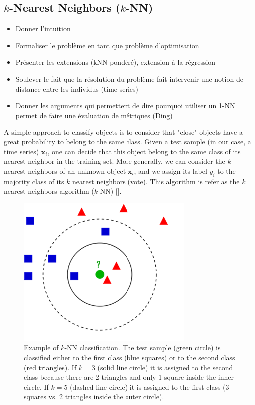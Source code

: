 \subsection{$k$-Nearest Neighbors ($k$-NN)}
\begin{itemize}
	\item Donner l'intuition
	\item Formaliser le problème en tant que problème d'optimisation
	\item Présenter les extensions (kNN pondéré), extension à la régression
	\item Soulever le fait que la résolution du problème fait intervenir une notion de distance entre les individus (time series)	
	\item Donner les arguments qui permettent de dire pourquoi utiliser un 1-NN permet de faire une évaluation de métriques (Ding)
\end{itemize}

A simple approach to classify objects is to consider that "close" objects have a great probability to belong to the same class. Given a test sample (in our case, a time series) $\textbf{x}_i$, one can decide that this object belong to the same class of its nearest neighbor in the training set. More generally, we can consider the $k$ nearest neighbors of an unknown object $\textbf{x}_i$, and we assign its label $y_i$ to the majority class of its $k$ nearest neighbors (vote). This algorithm is refer as the $k$ nearest neighbors algorithm ($k$-NN) [\cite{Dreyfus2006}].

\begin{figure}
\centering
\includegraphics[width=0.4\linewidth]{images/kNN_example}
\caption{Example of $k$-NN classification. The test sample (green circle) is classified either to the first class (blue squares) or to the second class (red triangles). If $k = 3$ (solid line circle) it is assigned to the second class because there are 2 triangles and only 1 square inside the inner circle. If $k = 5$ (dashed line circle) it is assigned to the first class (3 squares vs. 2 triangles inside the outer circle).}
\label{fig:kNN_example}
\end{figure}


